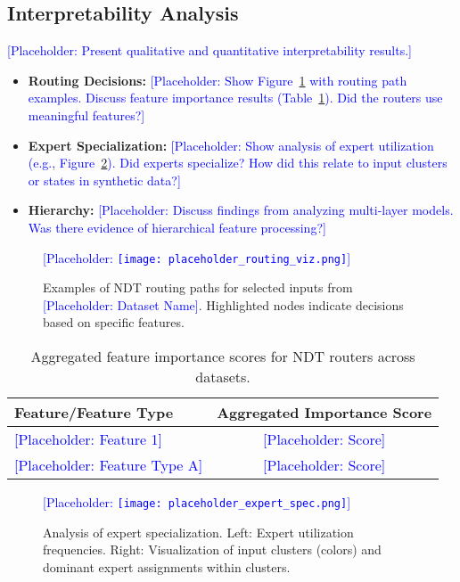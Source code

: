 \documentclass[11pt,a4paper]{article}
\newcommand{\placeholder}[1]{\textcolor{blue}{[Placeholder: #1]}}
\begin{document}
\subsection{Interpretability Analysis}
\placeholder{Present qualitative and quantitative interpretability results.}
\begin{itemize}
    \item \textbf{Routing Decisions:} \placeholder{Show Figure~\ref{fig:routing_viz} with routing path examples. Discuss feature importance results (Table~\ref{tab:feature_importance}). Did the routers use meaningful features?}
    \item \textbf{Expert Specialization:} \placeholder{Show analysis of expert utilization (e.g., Figure~\ref{fig:expert_specialization}). Did experts specialize? How did this relate to input clusters or states in synthetic data?}
    \item \textbf{Hierarchy:} \placeholder{Discuss findings from analyzing multi-layer models. Was there evidence of hierarchical feature processing?}
\end{itemize}

\begin{figure}[h!]
    \centering
    \placeholder{\texttt{[image: placeholder\_routing\_viz.png]}}
    \caption{Examples of NDT routing paths for selected inputs from \placeholder{Dataset Name}. Highlighted nodes indicate decisions based on specific features.}
    \label{fig:routing_viz}
\end{figure}

\begin{table}[h!]
    \centering
    \caption{Aggregated feature importance scores for NDT routers across datasets.}
    \label{tab:feature_importance}
    \begin{tabular}{lc}
        \toprule
        Feature/Feature Type & Aggregated Importance Score \\
        \midrule
        \placeholder{Feature 1} & \placeholder{Score} \\
        \placeholder{Feature Type A} & \placeholder{Score} \\
        \bottomrule
    \end{tabular}
\end{table}

\begin{figure}[h!]
    \centering
    \placeholder{\texttt{[image: placeholder\_expert\_spec.png]}}
    \caption{Analysis of expert specialization. Left: Expert utilization frequencies. Right: Visualization of input clusters (colors) and dominant expert assignments within clusters.}
    \label{fig:expert_specialization}
\end{figure}
\end{document}
